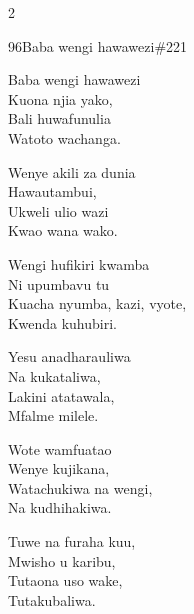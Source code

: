 \documentclass{article}
\begin{document}
\begin{multicols}{2}
\begin{hymn}{96}{Baba wengi hawawezi}{\#221}
\begin{stanza}
Baba wengi hawawezi\\
Kuona njia yako,\\
Bali huwafunulia\\
Watoto wachanga.
\end{stanza}
\begin{stanza}
Wenye akili za dunia\\
Hawautambui,\\
Ukweli ulio wazi\\
Kwao wana wako.
\end{stanza}
\begin{stanza}
Wengi hufikiri kwamba\\
Ni upumbavu tu\\
Kuacha nyumba, kazi, vyote,\\
Kwenda kuhubiri.
\end{stanza}
\begin{stanza}
Yesu anadharauliwa\\
Na kukataliwa,\\
Lakini atatawala,\\
Mfalme milele.
\end{stanza}
\begin{stanza}
Wote wamfuatao\\
Wenye kujikana,\\
Watachukiwa na wengi,\\
Na kudhihakiwa.
\end{stanza}
\begin{stanza}
Tuwe na furaha kuu,\\
Mwisho u karibu,\\
Tutaona uso wake,\\
Tutakubaliwa.
\end{stanza}
\end{hymn}


\end{multicols}
\end{document}
